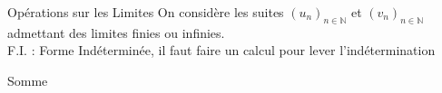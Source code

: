 \documentclass{coursbook}
\begin{document}
    \begin{Gpartie}{Opérations sur les Limites} 
        On considère les suites $(u_n)_{n\in\mathbb{N}}$ et $(v_n)_{n\in\mathbb{N}}$ admettant des limites finies ou infinies. \\ F.I. : Forme Indéterminée, il faut faire un calcul pour lever l'indétermination
        \begin{Spartie}{Somme}
            \vspace{-2ex}
            \begin{table}[H] \centering {} 
            \end{table}

\end{Spartie}
\end{Gpartie}
\end{document}

